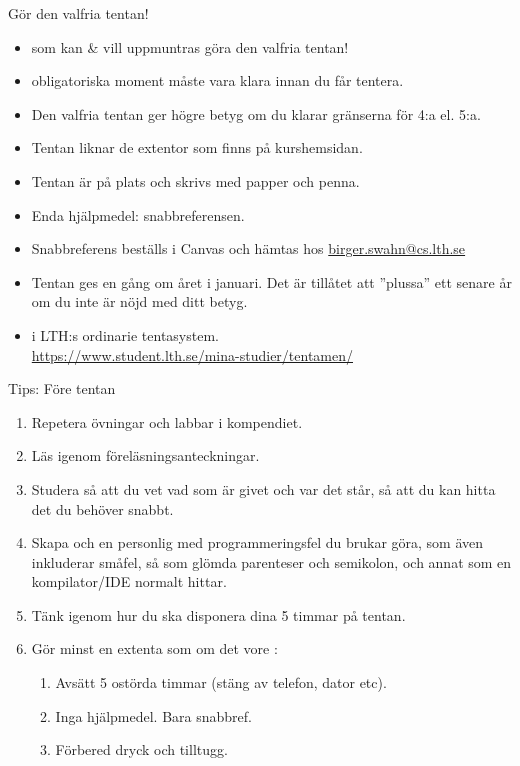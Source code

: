 \begin{SlideExtra}{Gör den valfria tentan!}
\begin{itemize}\SlideFontSmall
  \item {} som kan \& vill uppmuntras göra den valfria tentan!
  \item {} obligatoriska moment måste vara klara innan du får tentera.
  \item Den valfria tentan ger högre betyg om du klarar gränserna för 4:a el. 5:a.
  \item Tentan liknar de extentor som finns på kurshemsidan.
  \item Tentan är på plats och skrivs med papper och penna. 
  \item Enda hjälpmedel: snabbreferensen.
  \item Snabbreferens beställs i Canvas och hämtas hos \url{birger.swahn@cs.lth.se}
  \item Tentan ges en gång om året i januari. Det är tillåtet att ''plussa'' ett senare år om du inte är nöjd med ditt betyg.
  \item {} i LTH:s ordinarie tentasystem. \\ %
  \url{https://www.student.lth.se/mina-studier/tentamen/} 
\end{itemize}
\end{SlideExtra}


\begin{Slide}{Tips: Före tentan}\SlideFontSmall
\begin{enumerate}
\item Repetera övningar och labbar i kompendiet.
\item Läs igenom föreläsningsanteckningar.
\item Studera   så att du vet vad som är givet och var det står, så att du kan hitta det du behöver snabbt.
\item Skapa och  en personlig  med programmeringsfel du brukar göra, som även inkluderar småfel, så som glömda parenteser och semikolon, och annat som en kompilator/IDE normalt hittar.
\item Tänk igenom hur du ska disponera dina 5 timmar på tentan.
\item Gör minst en extenta som om det vore :
\begin{enumerate}\SlideFontTiny
\item Avsätt 5 ostörda timmar (stäng av telefon, dator etc).
\item Inga hjälpmedel. Bara snabbref.
\item Förbered dryck och tilltugg.
\end{enumerate}
\end{enumerate}
\end{Slide}

